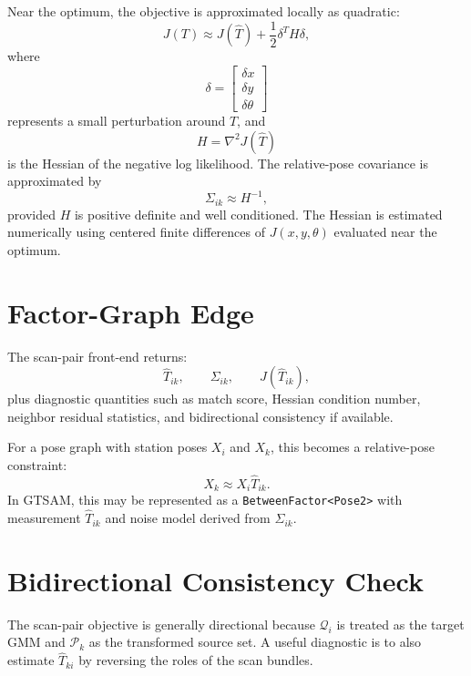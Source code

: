 \documentclass[11pt]{article}
\begin{document}
Near the optimum, the objective is approximated locally as quadratic:
\begin{equation}
J(T) \approx J(\hat T)
+ \frac{1}{2}
\delta^T H \delta,
\end{equation}
where
\begin{equation}
\delta =
\begin{bmatrix}
\delta x \\
\delta y \\
\delta\theta
\end{bmatrix}
\end{equation}
represents a small perturbation around $\hat T$, and
\begin{equation}
H = \nabla^2 J(\hat T)
\end{equation}
is the Hessian of the negative log likelihood. The relative-pose covariance is approximated by
\begin{equation}
\Sigma_{ik} \approx H^{-1},
\end{equation}
provided $H$ is positive definite and well conditioned. The Hessian is estimated numerically using centered finite differences of $J(x,y,\theta)$ evaluated near the optimum.

\section{Factor-Graph Edge}

The scan-pair front-end returns:
\begin{equation}
\hat T_{ik}, \qquad \Sigma_{ik}, \qquad J(\hat T_{ik}),
\end{equation}
plus diagnostic quantities such as match score, Hessian condition number, neighbor residual statistics, and bidirectional consistency if available.

For a pose graph with station poses $X_i$ and $X_k$, this becomes a relative-pose constraint:
\begin{equation}
X_k \approx X_i \hat T_{ik}.
\end{equation}
In GTSAM, this may be represented as a \texttt{BetweenFactor<Pose2>} with measurement $\hat T_{ik}$ and noise model derived from $\Sigma_{ik}$.

\section{Bidirectional Consistency Check}

The scan-pair objective is generally directional because $\mathcal{Q}_i$ is treated as the target GMM and $\mathcal{P}_k$ as the transformed source set. A useful diagnostic is to also estimate $\hat T_{ki}$ by reversing the roles of the scan bundles.
\end{document}
